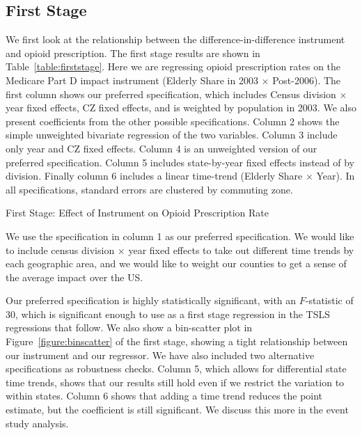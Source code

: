 \documentclass[12pt]{article}
\begin{document}
\subsection{First Stage}
We first look at the relationship between the difference-in-difference instrument and opioid prescription.  The first stage results are shown in Table~\ref{table:firststage}.  Here we are regressing opioid prescription rates on the Medicare Part D impact instrument (Elderly Share in 2003 $\times$ Post-2006).  The first column shows our preferred specification, which includes Census division $\times$ year fixed effects, CZ fixed effects, and is weighted by population in 2003.  We also present coefficients from the other possible specifications.  Column 2 shows the simple unweighted bivariate regression of the two variables.  Column 3 include only year and CZ fixed effects.  Column 4 is an unweighted version of our preferred specification.  Column 5 includes state-by-year fixed effects instead of by division.  Finally column 6 includes a linear time-trend (Elderly Share $\times$ Year).  In all specifications, standard errors are clustered by commuting zone.

\begin{table}
    \footnotesize
    \centering
    \caption{First Stage: Effect of Instrument on Opioid Prescription Rate}
    
    \label{table:firststage}
\end{table}

We use the specification in column 1 as our preferred specification.  We would like to include census division $\times$ year fixed effects to take out different time trends by each geographic area, and we would like to weight our counties to get a sense of the average impact over the US\@.

Our preferred specification is highly statistically significant, with an $F$-statistic of $30$, which is significant enough to use as a first stage regression in the TSLS regressions that follow.  
We also show a bin-scatter plot in Figure~\ref{figure:binscatter} of the first stage, showing a tight relationship between our instrument and our regressor.  We have also included two alternative specifications as robustness checks.  Column 5, which allows for differential state time trends, shows that our results still hold even if we restrict the variation to within states.  Column 6 shows that adding a time trend reduces the point estimate, but the coefficient is still significant.  We discuss this more in the event study analysis.
\end{document}
